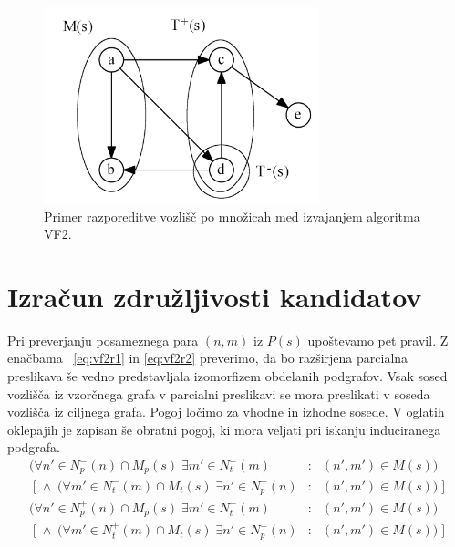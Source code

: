 \documentclass[a4paper, 12pt, ]{book}
\begin{document}
	\begin{figure}
	\begin{center}
	\includegraphics[width=8cm]{img/graph_t_in_out.png}
	\end{center}
	\caption{Primer razporeditve vozlišč po množicah med izvajanjem algoritma VF2.}
	\label{pic_t_in_out}
	\end{figure}



	\section{Izračun združljivosti kandidatov}
	\label{vf2:feasible}

	Pri preverjanju posameznega para $(n,m)$ iz $P(s)$ upoštevamo pet pravil. Z enačbama ~\ref{eq:vf2r1} in \ref{eq:vf2r2} preverimo, da bo razširjena
	parcialna preslikava še vedno predstavljala izomorfizem obdelanih podgrafov. Vsak sosed vozlišča iz vzorčnega grafa v parcialni preslikavi se mora
	preslikati v soseda vozlišča iz ciljnega grafa. Pogoj ločimo za vhodne in izhodne sosede. V oglatih oklepajih je zapisan
	še obratni pogoj, ki mora veljati pri iskanju induciranega podgrafa.
	\begin{equation}
	\label{eq:vf2r1}
	\begin{array}{rcl}
	(\forall n' \in N_p^-(n) \cap M_p(s) \; \exists m' \in N_t^-(m)    \!\!\!&:&\!\!	 (n', m') \in M(s)) \\
	\;[\; \wedge \; (\forall m' \in N_t^-(m) \cap M_t(s)\; \exists n' \in N_p^-(n) \!\!\!&:&\!\! (n', m') \in M(s)) \;]
	\end{array}
	\end{equation}
	\begin{equation}
	\label{eq:vf2r2}
	\begin{array}{rcl}
	(\forall n' \in N_p^+(n)  \cap M_p(s)  \; \exists m' \in N_t^+(m)    \!\!\!&:&\!\!	 (n', m') \in M(s)) \\
	\;[\; \wedge \; (\forall m' \in N_t^+(m) \cap  M_t(s)\; \exists n' \in N_p^+(n)     \!\!\!&:&\!\!	 (n', m') \in M(s)) \;]
	\end{array}
	\end{equation}
	
\end{document}
